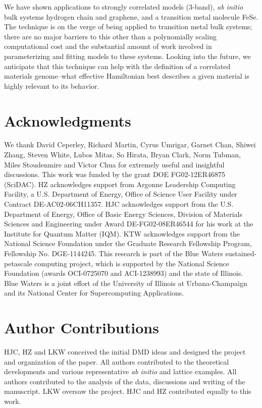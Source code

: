 \documentclass[aps, prb, 11pt]{revtex4-1}
\begin{document}
We have shown applications to strongly correlated models (3-band), {\it ab initio} bulk systems hydrogen chain and graphene, and a transition metal molecule FeSe.
The technique is on the verge of being applied to transition metal bulk systems; there are no major barriers to this other than a polynomially scaling computational cost and the substantial amount of work involved in parameterizing and fitting models to these systems.
Looking into the future, we anticipate that this technique can help with the definition of a correlated materials genome--what effective Hamiltonian best describes a given material is highly relevant to its behavior.

\section*{Acknowledgments} 
We thank  David Ceperley,  Richard Martin, Cyrus Umrigar,  Garnet Chan,  Shiwei Zhang, Steven White,  
Lubos Mitas, So Hirata, Bryan Clark, Norm Tubman, Miles Stoudenmire and Victor Chua for extremely useful and insightful discussions. 
This work was funded by the grant DOE FG02-12ER46875 (SciDAC). 
HZ acknowledges support from Argonne Leadership Computing Facility, a U.S. Department of Energy, Office of Science User Facility under Contract DE-AC02-06CH11357.
HJC acknowledges support from the U.S. Department of Energy, 
Office of Basic Energy Sciences, Division of Materials Sciences and Engineering under Award DE-FG02-08ER46544 for his work at the Institute for Quantum Matter (IQM). 
KTW acknowledges support from the National Science Foundation under the Graduate Research Fellowship Program, Fellowship No. DGE-1144245.
This research is part of the Blue Waters sustained-petascale computing project, which is supported by the National Science Foundation (awards OCI-0725070 and ACI-1238993) and the state of Illinois. Blue Waters is a joint effort of the University of Illinois at Urbana-Champaign and its National Center for Supercomputing Applications.

\section*{Author Contributions}
HJC, HZ and LKW conceived the initial DMD ideas and designed the project and organization of the paper. 
All authors contributed to the theoretical developments and various representative \textit{ab initio} and lattice examples. 
All authors contributed to the analysis of the data, discussions and writing of the manuscript. 
LKW oversaw the project. HJC and HZ contributed equally to this work.
 
\end{document}
